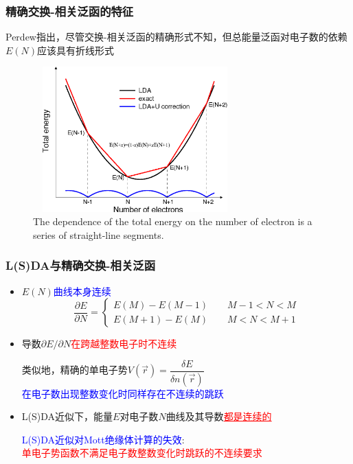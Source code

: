 {\frame
{
	\frametitle{精确交换-相关泛函的特征}
	\textrm{Perdew}指出，尽管交换-相关泛函的精确形式不知，但总能量泛函对电子数的依赖$E(N)$应该具有折线形式
\begin{figure}[h!]
\centering
\vspace*{-0.1in}
\includegraphics[height=2.2in,width=3.1in,viewport=0 0 1200 890,clip]{Figures/Koopmans-condition_LDA-U.png}
\caption{\tiny \textrm{The dependence of the total energy on the number of electron is a series of straight-line segments.}}%
\label{exact-DFT}
\end{figure}
}

\frame
{
	\frametitle{\textrm{L(S)DA}与精确交换-相关泛函}
	\begin{itemize}
		\item $E(N)$\textcolor{blue}{曲线本身连续}
	\begin{displaymath}
		\dfrac{\partial E}{\partial N}=\left\{
		\begin{aligned}
			E(M)-E(M-1)\qquad M-1<N<M\\
			E(M+1)-E(M)\qquad M<N<M+1 
		\end{aligned}\right.
	\end{displaymath}
		\item 导数$\partial E/\partial N$\textcolor{red}{在跨越整数电子时不连续}

	类似地，精确的单电子势$V(\vec r)=\dfrac{\delta E}{\delta n(\vec r)}$\\
	\textcolor{blue}{在电子数出现整数变化时同样存在不连续的跳跃}
		\item \textrm{L(S)DA}近似下，能量$E$对电子数$N$曲线及其导数\textcolor{red}{\underline{都是连续的}}
	
			\vspace{10pt}
	\textcolor{blue}{\textrm{L(S)DA}近似对\textrm{Mott}绝缘体计算的失效}:\\
	\textcolor{red}{单电子势函数不满足电子数整数变化时跳跃的不连续要求}
	\end{itemize}
}

}
